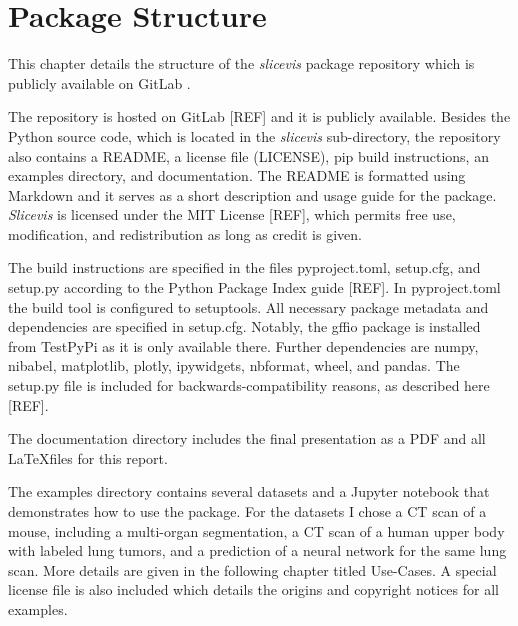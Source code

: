 \chapter{Package Structure}
This chapter details the structure of the \emph{slicevis} package repository which is publicly available on GitLab \cite{repo}.

The repository is hosted on GitLab [REF] and it is publicly available. Besides the Python source code, which is located in the \emph{slicevis} sub-directory, the repository also contains a README, a license file (LICENSE), pip build instructions, an examples directory, and documentation. The README is formatted using Markdown and it serves as a short description and usage guide for the package. \emph{Slicevis} is licensed under the MIT License [REF], which permits free use, modification, and redistribution as long as credit is given. 

The build instructions are specified in the files pyproject.toml, setup.cfg, and setup.py according to the Python Package Index guide [REF]. In pyproject.toml the build tool is configured to setuptools. All necessary package metadata and dependencies are specified in setup.cfg. Notably, the gffio package is installed from TestPyPi as it is only available there. Further dependencies are numpy, nibabel, matplotlib, plotly, ipywidgets, nbformat, wheel, and pandas. The setup.py file is included for backwards-compatibility reasons, as described here [REF].

The documentation directory includes the final presentation as a PDF and all \LaTeX files for this report.

The examples directory contains several datasets and a Jupyter notebook that demonstrates how to use the package. For the datasets I chose a CT scan of a mouse, including a multi-organ segmentation, a CT scan of a human upper body with labeled lung tumors, and a prediction of a neural network for the same lung scan. More details are given in the following chapter titled Use-Cases. A special license file is also included which details the origins and copyright notices for all examples.